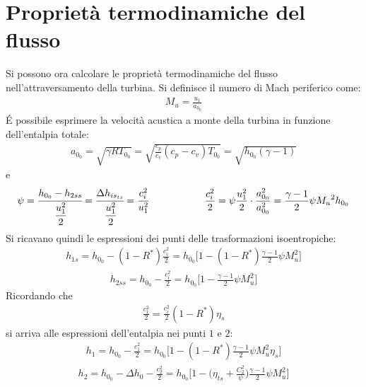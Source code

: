 \section{Proprietà termodinamiche del flusso}
Si possono ora calcolare le proprietà termodinamiche del flusso nell'attraversamento della turbina. Si definisce il numero di Mach periferico come:
\begin{align*}
M_u = \frac{u_1}{a_{0_0}}
\end{align*}
\'E possibile esprimere la velocità acustica a monte della turbina in funzione dell'entalpia totale:
\begin{align*}
a_{0_0} = \sqrt{\gamma RT_{0_0}} = \sqrt{\frac{c_p}{c_v} \left( c_p - c_v \right) T_{0_0}} = \sqrt{h_{0_0} \left( \gamma - 1 \right)}
\end{align*}
e
\begin{align*}
\psi = \cfrac{h_{0_0} - h_{2ss}}{\cfrac{u_1^2}{2}} = \cfrac{\Delta h_{is_{ts}}}{\cfrac{u_1^2}{2}} = \cfrac{c_i^2}{u_1^2} \hspace{2cm} \frac{c_i^2}{2} = \psi \frac{u_1^2}{2} \cdot \frac{a_{0_0}^2}{a_{0_0}^2} = \frac{\gamma-1}{2}\psi {M_u}^2 h_{0_0}
\end{align*}
Si ricavano quindi le espressioni dei punti delle trasformazioni isoentropiche:
\begin{align*}
h_{1s} = h_{0_0} - \left(1- R^* \right) \frac{c_i^2}{2} = h_{0_0} \bigg[ 1- \left( 1- R^* \right) \frac{\gamma-1}{2} \psi M_u^2 \bigg]
\end{align*}
\begin{align*}
h_{2ss} = h_{0_0} - \frac{c_i^2}{2} = h_{0_0} \bigg[ 1 - \frac{\gamma-1}{2} \psi M_u^2 \bigg]
\end{align*}
Ricordando che
\begin{align*}
\frac{c_1^2}{2} = \frac{c_i^2}{2} \left( 1- R^* \right) \eta_s
\end{align*}
si arriva alle espressioni dell'entalpia nei punti $1$ e $2$:
\begin{align*}
\boxed{h_1 = h_{0_0} - \frac{c_1^2}{2} = h_{0_0} \bigg[ 1- \left( 1- R^* \right) \frac{\gamma-1}{2}  \psi M_u^2 \eta_s\bigg]}
\end{align*}
\begin{align*}
\boxed{h_2 = h_{0_0} - \Delta h_0 - \frac{c_2^2}{2} = h_{0_0} \bigg[ 1- \bigg( \eta_{ts} + \frac{C_2^2}{\psi} \bigg) \frac{\gamma-1}{2} \psi M_u^2 \bigg]}
\end{align*}

